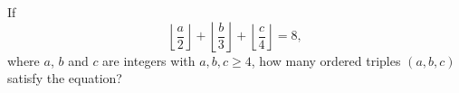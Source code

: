 If
\[
\left\lfloor \dfrac{a}{2} \right\rfloor+\left\lfloor \dfrac{b}{3} \right\rfloor+\left\lfloor \dfrac{c}{4} \right\rfloor=8,
\]
where $a$, $b$ and $c$ are integers with $a,b,c\ge4$, how many ordered triples $(a,b,c)$ satisfy the equation?
